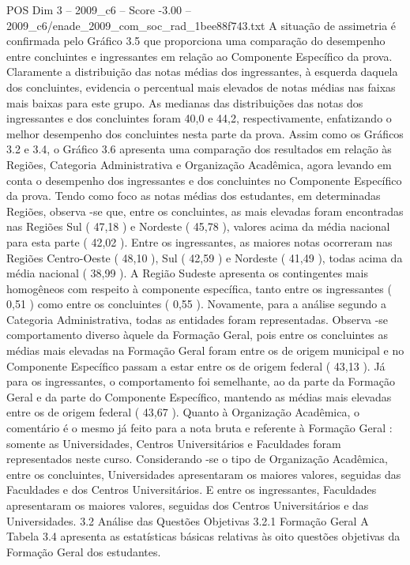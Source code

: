 \begin{textsample}{POS Dim 3 – 2009\_c6 – Score -3.00 – 2009\_c6/enade\_2009\_com\_soc\_rad\_1bee88f743.txt}
A situação de assimetria é confirmada pelo Gráfico 3.5 que proporciona uma comparação do desempenho entre concluintes e ingressantes em relação ao Componente Específico da prova.
Claramente a distribuição das notas médias dos ingressantes, à esquerda daquela dos concluintes, evidencia o percentual mais elevados de notas médias nas faixas mais baixas para este grupo.
As medianas das distribuições das notas dos ingressantes e dos concluintes foram 40,0 e 44,2, respectivamente, enfatizando o melhor desempenho dos concluintes nesta parte da prova.
Assim como os Gráficos 3.2 e 3.4, o Gráfico 3.6 apresenta uma comparação dos resultados em relação às Regiões, Categoria Administrativa e Organização Acadêmica, agora levando em conta o desempenho dos ingressantes e dos concluintes no Componente Específico da prova.
Tendo como foco as notas médias dos estudantes, em determinadas Regiões, observa -se que, entre os concluintes, as mais elevadas foram encontradas nas Regiões Sul ( 47,18 ) e Nordeste ( 45,78 ), valores acima da média nacional para esta parte ( 42,02 ).
Entre os ingressantes, as maiores notas ocorreram nas Regiões Centro-Oeste ( 48,10 ), Sul ( 42,59 ) e Nordeste ( 41,49 ), todas acima da média nacional ( 38,99 ).
A Região Sudeste apresenta os contingentes mais homogêneos com respeito à componente específica, tanto entre os ingressantes ( 0,51 ) como entre os concluintes ( 0,55 ).
Novamente, para a análise segundo a Categoria Administrativa, todas as entidades foram representadas.
Observa -se comportamento diverso àquele da Formação Geral, pois entre os concluintes as médias mais elevadas na Formação Geral foram entre os de origem municipal e no Componente Específico passam a estar entre os de origem federal ( 43,13 ).
Já para os ingressantes, o comportamento foi semelhante, ao da parte da Formação Geral e da parte do Componente Específico, mantendo as médias mais elevadas entre os de origem federal ( 43,67 ).
Quanto à Organização Acadêmica, o comentário é o mesmo já feito para a nota bruta e referente à Formação Geral : somente as Universidades, Centros Universitários e Faculdades foram representados neste curso.
Considerando -se o tipo de Organização Acadêmica, entre os concluintes, Universidades apresentaram os maiores valores, seguidas das Faculdades e dos Centros Universitários.
E entre os ingressantes, Faculdades apresentaram os maiores valores, seguidas dos Centros Universitários e das Universidades. 3.2 Análise das Questões Objetivas 3.2.1 Formação Geral A Tabela 3.4 apresenta as estatísticas básicas relativas às oito questões objetivas da Formação Geral dos estudantes.

\end{textsample}
